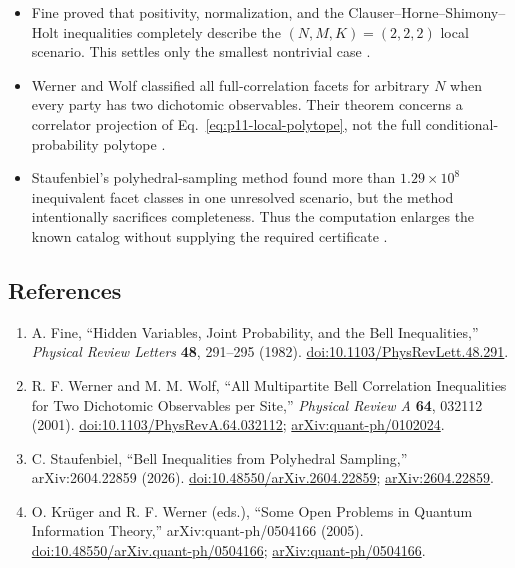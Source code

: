 \begin{itemize}
  \item Fine proved that positivity, normalization, and the
  Clauser--Horne--Shimony--Holt inequalities completely describe the
  $(N,M,K)=(2,2,2)$ local scenario.  This settles only the smallest
  nontrivial case
  .

  \item Werner and Wolf classified all full-correlation facets for arbitrary
  $N$ when every party has two dichotomic observables.  Their theorem concerns
  a correlator projection of Eq.~\eqref{eq:p11-local-polytope}, not the full
  conditional-probability polytope
  .

  \item Staufenbiel's polyhedral-sampling method found more than
  $1.29\times10^8$ inequivalent facet classes in one unresolved scenario, but
  the method intentionally sacrifices completeness.  Thus the computation
  enlarges the known catalog without supplying the required certificate
  .
\end{itemize}

\subsection*{References}

\begin{enumerate}[label={},leftmargin=4.8em,labelsep=0.5em]
  \footnotesize
  \item[\textup{[Fin82]}]\label{ref:p11-fine}
  A. Fine,
  ``Hidden Variables, Joint Probability, and the Bell Inequalities,''
  \emph{Physical Review Letters} \textbf{48}, 291--295 (1982).
  \href{https://doi.org/10.1103/PhysRevLett.48.291}%
       {doi:10.1103/PhysRevLett.48.291}.

  \item[\textup{[WW01]}]\label{ref:p11-werner-wolf}
  R. F. Werner and M. M. Wolf,
  ``All Multipartite Bell Correlation Inequalities for Two Dichotomic
  Observables per Site,''
  \emph{Physical Review A} \textbf{64}, 032112 (2001).
  \href{https://doi.org/10.1103/PhysRevA.64.032112}%
       {doi:10.1103/PhysRevA.64.032112};
  \href{https://arxiv.org/abs/quant-ph/0102024}%
       {arXiv:quant-ph/0102024}.

  \item[\textup{[Sta26]}]\label{ref:p11-staufenbiel}
  C. Staufenbiel,
  ``Bell Inequalities from Polyhedral Sampling,'' arXiv:2604.22859 (2026).\newline
  \href{https://doi.org/10.48550/arXiv.2604.22859}%
       {doi:10.48550/arXiv.2604.22859};
  \href{https://arxiv.org/abs/2604.22859}{arXiv:2604.22859}.

  \item[\textup{[KW05]}]\label{ref:p11-krueger-werner}
  O. Krüger and R. F. Werner (eds.),
  ``Some Open Problems in Quantum Information Theory,''
  arXiv:quant-ph/0504166 (2005).
  \href{https://doi.org/10.48550/arXiv.quant-ph/0504166}%
       {doi:10.48550/arXiv.quant-ph/0504166};
  \href{https://arxiv.org/abs/quant-ph/0504166}%
       {arXiv:quant-ph/0504166}.
\end{enumerate}


